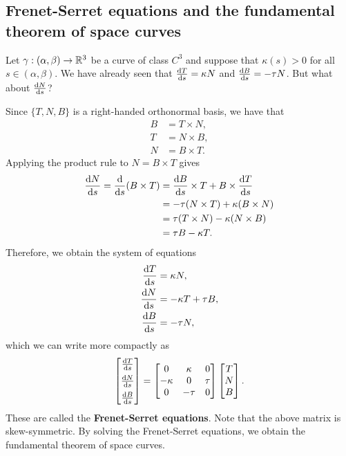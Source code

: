 \subsection{Frenet-Serret equations and the fundamental theorem of 
space curves} \label{subsec:2.3}
Let $\gamma : (\alpha, \beta) \to \mathbb{R}^3$ be a curve of class $C^3$ and suppose 
that $\kappa(s) > 0$ for all $s \in (\alpha, \beta)$. We have already seen that 
$\frac{{\rm d}T}{{\rm d}s} = \kappa N$ and $\frac{{\rm d}B}{{\rm d}s} = -\tau N$.
But what about $\frac{{\rm d}N}{{\rm d}s}$? 

Since $\{T, N, B\}$ is a right-handed orthonormal basis, we have that 
\begin{align*}
    B &= T \times N, \\ 
    T &= N \times B, \\ 
    N &= B \times T. 
\end{align*}
Applying the product rule to $N = B \times T$ gives 
\begin{align*} 
    \frac{{\rm d}N}{{\rm d}s} = \frac{{\rm d}}{{\rm d}s}(B \times T) 
    &= \frac{{\rm d}B}{{\rm d}s} \times T + B \times \frac{{\rm d}T}{{\rm d}s} \\ 
    &= -\tau(N \times T) + \kappa(B \times N) \\
    &= \tau(T \times N) - \kappa(N \times B) \\
    &= \tau B - \kappa T.
\end{align*}
Therefore, we obtain the system of equations 
\begin{align*}
    \frac{{\rm d}T}{{\rm d}s} &= \kappa N, \\ 
    \frac{{\rm d}N}{{\rm d}s} &=  - \kappa T + \tau B, \\ 
    \frac{{\rm d}B}{{\rm d}s} &= -\tau N,
\end{align*}
which we can write more compactly as 
\[ \begin{bmatrix}
    \frac{{\rm d}T}{{\rm d}s} \\[5pt] 
    \frac{{\rm d}N}{{\rm d}s} \\[5pt] 
    \frac{{\rm d}B}{{\rm d}s}
\end{bmatrix} = \begin{bmatrix}
    0 & \kappa & 0 \\ 
    -\kappa & 0 & \tau \\ 
    0 & -\tau & 0 
\end{bmatrix} \begin{bmatrix}
    T \\ N \\ B 
\end{bmatrix}. \] 
These are called the {\bf Frenet-Serret equations}. Note that the above matrix 
is skew-symmetric. 
By solving the Frenet-Serret equations, we obtain the fundamental theorem 
of space curves.

